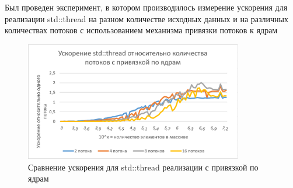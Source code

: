 \documentclass{report}
\begin{document}
\par Был проведен эксперимент, в котором производилось измерение ускорения для реализации std::thread на разном количестве исходных данных и на различных количествах потоков с использованием механизма привязки потоков к ядрам
\begin{figure}[H]
    \centering
    \includegraphics[width=0.85\textwidth]{images/boost_std_with_affinity.png}
    \caption{Сравнение ускорения для std::thread реализации с привязкой по ядрам}
    \label{fig:my_label_6}
\end{figure}

\newpage

\end{document}
